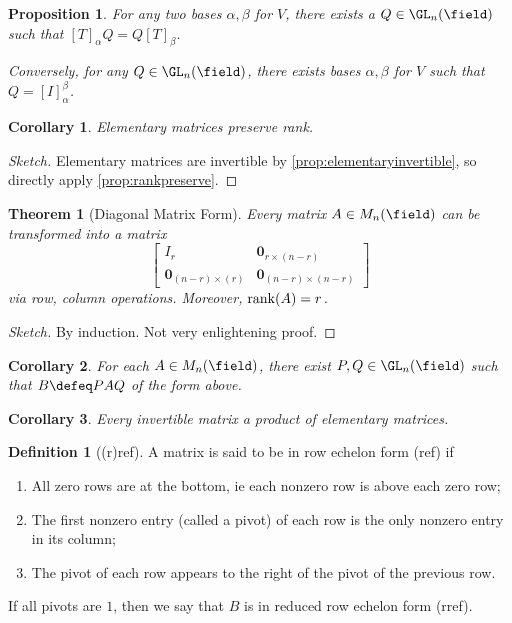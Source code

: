 \documentclass[12pt, oneside]{article}
\theoremstyle{definition}
\newtheorem{defn}{Definition}
\theoremstyle{plain}
\newtheorem{thm}{Theorem}
\newtheorem{cor}{Corollary}
\newtheorem{prop}{Proposition}
\theoremstyle{remark}
\begin{document}
\begin{prop}
For any two bases $\alpha, \beta$ for $V$, there exists a $Q \in \GL_n(\field)$ such that $[T]_\alpha Q = Q[T]_\beta$.

Conversely, for any $Q \in \GL_n(\field)$, there exists bases $\alpha, \beta$ for $V$ such that $Q = [I]_\alpha^\beta$.
\end{prop}

\begin{cor}
  Elementary matrices preserve rank.
\end{cor}

\begin{proof}[Sketch]
  Elementary matrices are invertible by \cref{prop:elementaryinvertible}, so directly apply \cref{prop:rankpreserve}.
\end{proof}

\begin{thm}[Diagonal Matrix Form]
  Every matrix $A \in M_{n}(\field)$ can be transformed into a matrix \[
    \begin{bmatrix}
      I_{r} & \mathbf{0}_{r \times (n-r)} \\
      \mathbf{0}_{(n-r) \times (r)} & \mathbf{0}_{(n-r) \times (n-r)}
  \end{bmatrix}  
  \]
  via row, column operations. Moreover, $\rank(A) = r$.
\end{thm}

\begin{proof}[Sketch]
  By induction. Not very enlightening proof.
\end{proof}

\begin{cor}
    For each $A \in M_{n}(\field)$, there exist $P, Q \in \GL_n(\field)$ such that $B \defeq P AQ$ of the form above.
\end{cor}

\begin{cor}
  Every invertible matrix a product of elementary matrices.
\end{cor}




\begin{defn}[(r)ref]
  A matrix is said to be in row echelon form (ref) if 
  \begin{enumerate}
    \item All zero rows are at the bottom, ie each nonzero row is above each zero row;
    \item The first nonzero entry (called a pivot) of each row is the only nonzero entry in its column;
    \item The pivot of each row appears to the right of the pivot of the previous row.
\end{enumerate}
If all pivots are $1$, then we say that $B$ is in reduced row echelon form (rref).
\end{defn}
\end{document}
